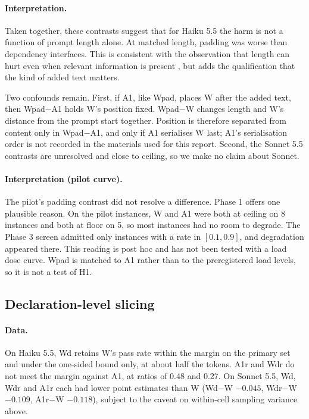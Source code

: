 \paragraph{Interpretation.} Taken together, these contrasts suggest that for Haiku 5.5 the harm is not a function of prompt length alone. At matched length, padding was worse than dependency interfaces. This is consistent with the observation that length can hurt even when relevant information is present \cite{du2025}, but adds the qualification that the kind of added text matters.

Two confounds remain. First, if A1, like Wpad, places W after the added text, then Wpad$-$A1 holds W's position fixed. Wpad$-$W changes length and W's distance from the prompt start together. Position \cite{liu2024} is therefore separated from content only in Wpad$-$A1, and only if A1 serialises W last; A1's serialisation order is not recorded in the materials used for this report. Second, the Sonnet 5.5 contrasts are unresolved and close to ceiling, so we make no claim about Sonnet.

\paragraph{Interpretation (pilot curve).} The pilot's padding contrast did not resolve a difference. Phase 1 offers one plausible reason. On the pilot instances, W and A1 were both at ceiling on 8 instances and both at floor on 5, so most instances had no room to degrade. The Phase 3 screen admitted only instances with a rate in $[0.1, 0.9]$, and degradation appeared there. This reading is post hoc and has not been tested with a load dose curve. Wpad is matched to A1 rather than to the preregistered load levels, so it is not a test of H1.

\subsection{Declaration-level slicing}

\paragraph{Data.} On Haiku 5.5, Wd retains W's pass rate within the margin on the primary set and under the one-sided bound only, at about half the tokens. A1r and Wdr do not meet the margin against A1, at ratios of 0.48 and 0.27. On Sonnet 5.5, Wd, Wdr and A1r each had lower point estimates than W (Wd$-$W $-0.045$, Wdr$-$W $-0.109$, A1r$-$W $-0.118$), subject to the caveat on within-cell sampling variance above.

